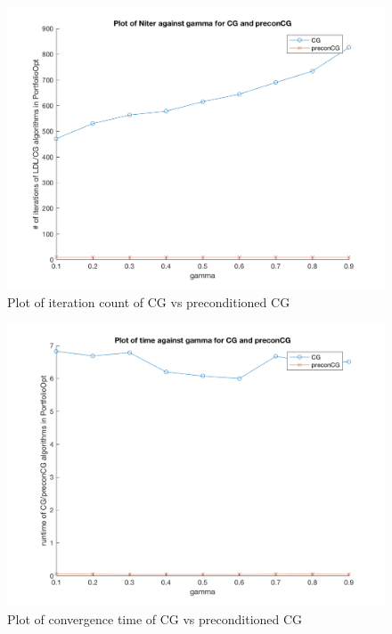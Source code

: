 \documentclass[paper=a4, fontsize=12pt]{scrartcl} %
\numberwithin{equation}{section}       %
\numberwithin{figure}{section}         %
\numberwithin{table}{section}          %
\begin{document}
\begin{center}
	\begin{figure}[h!]
	  \includegraphics[width=\linewidth]{CGvspreconCG_Niter}
	  \caption{Plot of iteration count of CG vs preconditioned CG}
	  \label{fig:cgvspre_N}
	\end{figure}
\end{center}

\begin{center}
	\begin{figure}[h!]
	  \includegraphics[width=\linewidth]{CGvspreconCG_time}
	  \caption{Plot of convergence time of CG vs preconditioned CG}
	  \label{fig:cgcspre_t}
	\end{figure}
\end{center}
\end{document}
